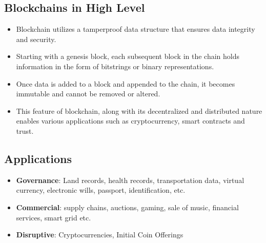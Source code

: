 \documentclass{report}
\begin{document}
\subsection{Blockchains in High Level}
\begin{itemize}
    \item Blockchain utilizes a tamperproof data structure that ensures data integrity and security.
    \item Starting with a genesis block, each subsequent block in the chain holds information in the form of bitstrings or binary representations.
    \item Once data is added to a block and appended to the chain, it becomes immutable and cannot be removed or altered.
    \item This feature of blockchain, along with its decentralized and distributed nature enables various applications such as cryptocurrency, smart contracts and trust.
\end{itemize}
\subsection{Applications}
\begin{itemize}
    \item \textbf{Governance}: Land records, health records, transportation data, virtual currency, electronic wills, passport, identification, etc.
    \item \textbf{Commercial}: supply chains, auctions, gaming, sale of music, financial services, smart grid etc.
    \item \textbf{Disruptive}: Cryptocurrencies, Initial Coin Offerings
\end{itemize}
\end{document}

